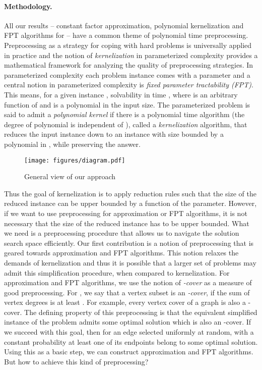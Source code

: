 \paragraph{Methodology.} 
All  our  results -- constant factor approximation, polynomial kernelization and   FPT algorithms for  \fd{} -- have a common theme of  polynomial time preprocessing. Preprocessing as a strategy for coping with hard problems is universally applied 
in practice and the notion of {\em kernelization} in parameterized complexity  provides a mathematical framework for analyzing the quality of preprocessing strategies. 
  In parameterized complexity each problem instance comes with a parameter  and  a central notion in parameterized complexity is {\em fixed parameter tractability (FPT)}. This means, for a given instance , solvability in time , where  is an arbitrary function of  and  is a polynomial in the input size. 
  The parameterized problem is said to admit a {\it polynomial kernel} if there is a polynomial time algorithm (the degree of polynomial is independent of ), called a {\em kernelization} algorithm, that reduces the input instance down to an instance with size bounded by a polynomial  in , while preserving the answer.  
  
  
 

\begin{figure}[t]
\begin{center}
\texttt{[image: figures/diagram.pdf]}
\caption{General  view of our approach }\label{fig:diagram}
\end{center}
\end{figure}

  
 Thus the goal of kernelization is to apply reduction rules such that  the size of the reduced instance can be upper bounded by a function of the parameter. However, if we want to use preprocessing for approximation or  FPT algorithms, it is not necessary 
 that  the size of the reduced instance has to be upper bounded. What we need is a preprocessing procedure that allows us  to 
 navigate the solution search space efficiently.  Our first contribution is a notion of preprocessing  that is 
  geared towards  approximation and FPT algorithms. This notion relaxes the demands of kernelization and thus it is possible 
  that a larger set of problems may admit this simplification procedure, when compared to kernelization. 
For approximation and FPT algorithms, we use the notion of {\em -cover} as a measure of good preprocessing. 
For  , we say that a vertex subset  is an \emph{-cover}, if 
the sum of vertex degrees      is at least  .
  For example, every vertex cover of a graph is also a -cover. 
  The  defining property of this preprocessing is that the equivalent simplified instance of the problem
 admits some optimal solution which is also  an -cover.  If we succeed with this goal, then for  an edge  selected 
 uniformly at random,   with a constant probability   at least  one of its endpoints belong to some optimal solution. Using this as a basic step, we 
can construct approximation and FPT algorithms. 
 But how to  achieve this kind of preprocessing?
 


